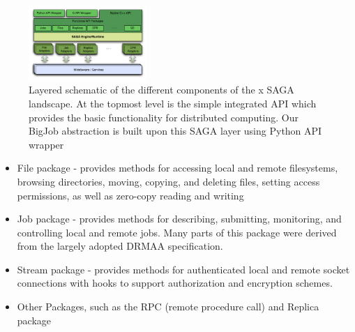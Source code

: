 \documentclass[conference,final]{IEEEtran}
\begin{document}
\begin{figure}[!ht]
 \begin{center}
     \includegraphics[width=0.40\textwidth]{stci_saga_figures-1.pdf}
 \end{center}
\caption{\small Layered schematic of the different components of the
x   SAGA landscape. At the topmost level is the simple integrated API
   which provides the basic functionality for distributed
   computing. Our BigJob abstraction is built upon this SAGA layer
   using Python API wrapper} \label{Fig:SAGA1}
\end{figure}

\begin{itemize}
\item File package - provides methods for accessing local and remote
 filesystems, browsing directories, moving, copying, and deleting
 files, setting access permissions, as well as zero-copy reading and
 writing
\item Job package - provides methods for describing, submitting,
 monitoring, and controlling local and remote jobs. Many parts of
 this package were derived from the largely adopted
 DRMAA %
 specification.
\item Stream package - provides methods for authenticated local and
 remote socket connections with hooks to support authorization and
 encryption schemes.
\item Other Packages, such as the RPC (remote procedure call) and Replica
 package
\end{itemize}
\end{document}

